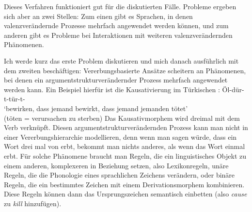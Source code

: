 \noindent
Dieses Verfahren funktioniert gut für die diskutierten Fälle. Probleme ergeben sich aber
an zwei Stellen: Zum einen gibt es Sprachen, in denen valenzverändernde Prozesse mehrfach
angewendet werden können, und zum anderen gibt es Probleme bei Interaktionen mit weiteren valenzverändernden Phänomenen.

Ich werde kurz das erste Problem diskutieren und mich danach ausführlich mit
dem zweiten beschäftigen: Vererbungsbasierte Ansätze scheitern an Phänomenen, bei denen ein argumentstrukturverändernder
Prozess mehrfach angewendet werden kann. Ein Beispiel hierfür ist die Kausativierung im Türkischen
\citep{Lewis67a-u}: 
\ea
Öl-dür-t-tür-t- \\
`bewirken, dass jemand bewirkt, dass jemand jemanden tötet'\\
(töten = verursachen zu sterben)
\z
Das Kausativmorphem  wird dreimal mit dem Verb verknüpft. Diesen argumentstrukturverändernden
Prozess kann man nicht in einer Vererbungshierarchie modellieren, denn wenn man sagen würde, dass
ein Wort drei mal von  erbt, bekommt man nichts anderes, als wenn das Wort
einmal erbt. Für solche Phänomene braucht man Regeln, die ein
linguistisches Objekt zu einem anderen, komplexeren in Beziehung setzen, also Lexikonregeln, unäre
Regeln, die die Phonologie eines sprachlichen Zeichens verändern, oder binäre Regeln, die ein
bestimmtes Zeichen mit einem Derivationsmorphem kombinieren. Diese Regeln können dann das
Ursprungszeichen semantisch einbetten (also \zb \emph{cause} zu \emph{kill} hinzufügen). 

